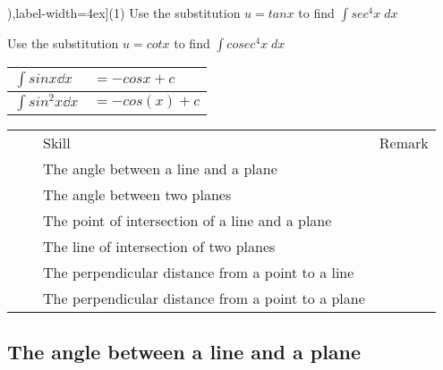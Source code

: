 
\newpage
\begin{exercise}
    \begin{tasks}[after-item-skip=2pt,after-skip=3pt, counter-format=(tsk[1]),label-width=4ex](1)
        \task  Use the substitution $u=tanx$ to find $\displaystyle \int sec^4x \;   dx $ 
                
        \task  Use the substitution $u=cotx$ to find $\displaystyle \int cosec^4x \; dx $ 
                
    \end{tasks}
\end{exercise}


\begin{table}[ht]
   \centering
   \sffamily
   \begin{tabular}{|l|l|}
     
        \hline   $\displaystyle \int sinx     \dd x $ & $=-cosx + c$ 
     \\ \hline   $\displaystyle \int sin^2x   \dd x $ & $=-cos(x) + c$
     \\ \hline
  \end{tabular}
\end{table}





\begin{center}
\begin{tabular}{|*{4}{l|}}
\hline
\rowcolor{lightgray}  &  & Skill & Remark \tabularnewline
                      &  & The angle between a line and a plane               & \tabularnewline
\hline
                      &  & The angle between two planes                       & \tabularnewline
\hline
                      &  & The point of intersection of a line and a plane    & \tabularnewline
\hline
                      &  & The line of intersection of two planes             & \tabularnewline
\hline
                      &  & The perpendicular distance from a point to a line  & \tabularnewline
\hline
                      &  & The perpendicular distance from a point to a plane & \tabularnewline
\hline
\end{tabular}
\end{center}


\subsection{The angle between a line and a plane}
